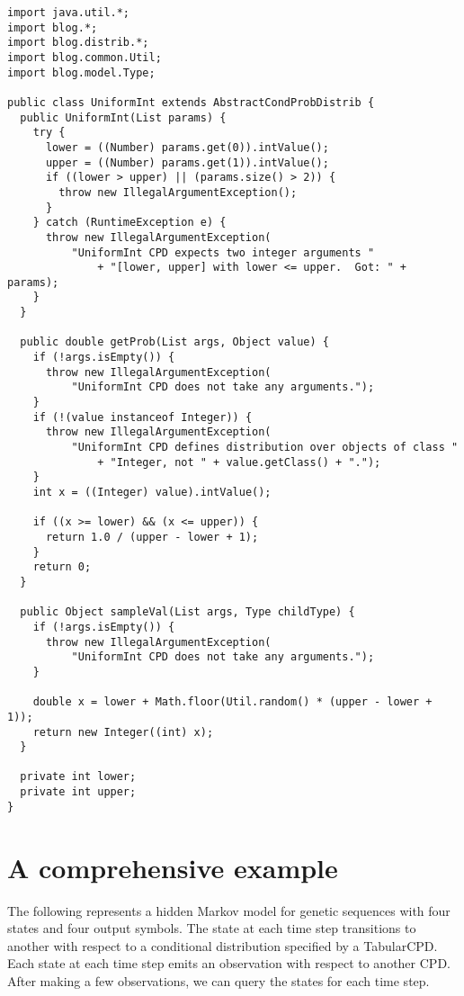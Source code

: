 \documentclass[12pt]{article}
\begin{document}
\begin{verbatim}
import java.util.*;
import blog.*;
import blog.distrib.*;
import blog.common.Util;
import blog.model.Type;

public class UniformInt extends AbstractCondProbDistrib {
  public UniformInt(List params) {
    try {
      lower = ((Number) params.get(0)).intValue();
      upper = ((Number) params.get(1)).intValue();
      if ((lower > upper) || (params.size() > 2)) {
        throw new IllegalArgumentException();
      }
    } catch (RuntimeException e) {
      throw new IllegalArgumentException(
          "UniformInt CPD expects two integer arguments "
              + "[lower, upper] with lower <= upper.  Got: " + params);
    }
  }

  public double getProb(List args, Object value) {
    if (!args.isEmpty()) {
      throw new IllegalArgumentException(
          "UniformInt CPD does not take any arguments.");
    }
    if (!(value instanceof Integer)) {
      throw new IllegalArgumentException(
          "UniformInt CPD defines distribution over objects of class "
              + "Integer, not " + value.getClass() + ".");
    }
    int x = ((Integer) value).intValue();

    if ((x >= lower) && (x <= upper)) {
      return 1.0 / (upper - lower + 1);
    }
    return 0;
  }

  public Object sampleVal(List args, Type childType) {
    if (!args.isEmpty()) {
      throw new IllegalArgumentException(
          "UniformInt CPD does not take any arguments.");
    }

    double x = lower + Math.floor(Util.random() * (upper - lower + 1));
    return new Integer((int) x);
  }

  private int lower;
  private int upper;
}
\end{verbatim}


\section{A comprehensive example}\label{-section}
\begin{example}
The following represents a hidden Markov model for genetic sequences with four states and four output symbols. The state at each time step transitions to another with respect to a conditional distribution specified by a TabularCPD. 
Each state at each time step emits an observation with respect to another CPD. After making a few observations, we can query the states for each time step.
\end{example}
\end{document}
